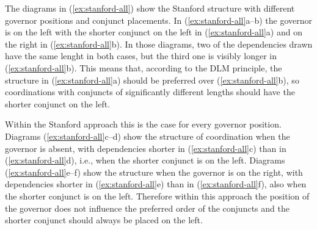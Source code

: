 \vspace{0.5\treeheight}

The diagrams in (\ref{ex:stanford-all}) show the Stanford structure with different governor positions and conjunct placements. In (\ref{ex:stanford-all}a--b) the governor is on the left with the shorter conjunct on the left in (\ref{ex:stanford-all}a) and on the right in (\ref{ex:stanford-all}b). In those diagrams, two of the dependencies drawn have the same lenght in both cases, but the third one is visibly longer in (\ref{ex:stanford-all}b). This means that, according to the DLM principle, the structure in (\ref{ex:stanford-all}a) should be preferred over (\ref{ex:stanford-all}b), so coordinations with conjuncts of significantly different lengths should have the shorter conjunct on the left. 

Within the Stanford approach this is the case for every governor position. Diagrams (\ref{ex:stanford-all}c--d) show the structure of coordination when the governor is absent, with dependencies shorter in (\ref{ex:stanford-all}c) than in (\ref{ex:stanford-all}d), i.e., when the shorter conjunct is on the left. Diagrams (\ref{ex:stanford-all}e--f) show the structure when the governor is on the right, with dependencies shorter in (\ref{ex:stanford-all}e) than in (\ref{ex:stanford-all}f), also when the shorter conjunct is on the left. Therefore within this approach the position of the governor does not influence the preferred order of the conjuncts and the shorter conjunct should always be placed on the left. 

